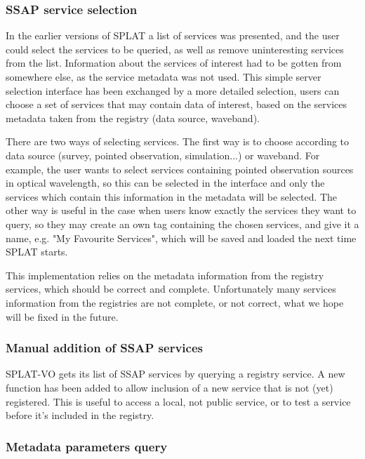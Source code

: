 \documentclass[final,authoryear,5p,times,twocolumn]{elsarticle}
\begin{document}
\subsubsection{SSAP service selection}

In the earlier versions of SPLAT a list of services was presented, and
the user could select the services to be queried, as well as remove
uninteresting services from the list. Information about the services
of interest had to be gotten from somewhere else, as the service
metadata was not used.  This simple server selection interface has
been exchanged by a more detailed selection, users can choose a set of
services that may contain data of interest, based on the services
metadata taken from the registry (data source, waveband).

There are two ways of selecting services. The first way is to choose
according to data source (survey, pointed observation, simulation...)
or waveband.  For example, the user wants to select services
containing pointed observation sources in optical wavelength, so this
can be selected in the interface and only the services which contain
this information in the metadata will be selected.  The other way is
useful in the case when users know exactly the services they want to
query, so they may create an own tag containing the chosen services,
and give it a name, e.g. "My Favourite Services", which will be saved
and loaded the next time SPLAT starts.

This implementation relies on the metadata information from the
registry services, which should be correct and complete. Unfortunately
many services information from the registries are not complete, or not
correct, what we hope will be fixed in the future.



\subsubsection{Manual addition of SSAP services}

SPLAT-VO gets its list of SSAP services by querying a registry
service.  A new function has been added to allow inclusion of a new
service that is not (yet) registered. This is useful to access a
local, not public service, or to test a service before it's included
in the registry.

\subsubsection{Metadata parameters query}
\end{document}
